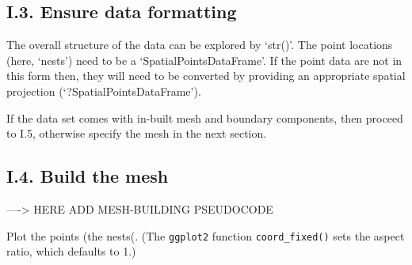\documentclass[
]{article}
\newenvironment{Shaded}{\begin{snugshade}}{\end{snugshade}}
\newcommand{\CommentTok}[1]{\textcolor[rgb]{0.56,0.35,0.01}{\textit{#1}}}
\newcommand{\FunctionTok}[1]{\textcolor[rgb]{0.00,0.00,0.00}{#1}}
\newcommand{\NormalTok}[1]{#1}
\newcommand{\OtherTok}[1]{\textcolor[rgb]{0.56,0.35,0.01}{#1}}
\newcommand{\SpecialCharTok}[1]{\textcolor[rgb]{0.00,0.00,0.00}{#1}}
\begin{document}
\hypertarget{i.3.-ensure-data-formatting}{%
\subsection{I.3. Ensure data
formatting}\label{i.3.-ensure-data-formatting}}

The overall structure of the data can be explored by `str()'. The point
locations (here, `nests') need to be a `SpatialPointsDataFrame'. If the
point data are not in this form then, they will need to be converted by
providing an appropriate spatial projection (`?SpatialPointsDataFrame').

\begin{Shaded}
\end{Shaded}

If the data set comes with in-built mesh and boundary components, then
proceed to I.5, otherwise specify the mesh in the next section.

\begin{Shaded}
\end{Shaded}

\hypertarget{i.4.-build-the-mesh}{%
\subsection{I.4. Build the mesh}\label{i.4.-build-the-mesh}}

----\textgreater{} HERE ADD MESH-BUILDING PSEUDOCODE

Plot the points (the nests(. (The \texttt{ggplot2} function
\texttt{coord\_fixed()} sets the aspect ratio, which defaults to 1.)
\end{document}
